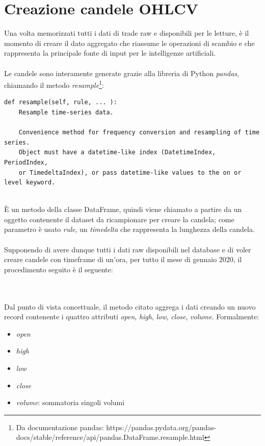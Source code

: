 \documentclass[a4paper,12pt]{report}
\begin{document}
\section{Creazione candele OHLCV}
Una volta memorizzati tutti i dati di trade raw e disponibili per le letture, è il momento di creare il dato aggregato che riassume le operazioni di scambio e che rappresenta la principale fonte di input per le intelligenze artificiali.\\~\\
Le candele sono interamente generate grazie alla libreria di Python \textit{pandas}, chiamando il metodo \textit{resample}\footnote{Da documentazione pandas: https://pandas.pydata.org/pandas-docs/stable/reference/api/pandas.DataFrame.resample.html}:
\begin{verbatim}
def resample(self, rule, ... ):
	Resample time-series data.
	
	Convenience method for frequency conversion and resampling of time series.
	Object must have a datetime-like index (DatetimeIndex, PeriodIndex, 
	or TimedeltaIndex), or pass datetime-like values to the on or level keyword.
	
\end{verbatim}

È un metodo della classe DataFrame, quindi viene chiamato a partire da un oggetto contenente il dataset da ricampionare per creare la candela; come parametro è usato \textit{rule}, un \textit{timedelta} che rappresenta la lunghezza della candela.
\\~\\
Supponendo di avere dunque tutti i dati raw disponibili nel database e di voler creare candele con timeframe di un'ora, per tutto il mese di gennaio 2020, il procedimento seguito è il seguente:


\\~\\
Dal punto di vista concettuale, il metodo citato aggrega i dati creando un nuovo record contenente i quattro attributi \textit{open}, \textit{high}, \textit{low}, \textit{close}, \textit{volume}. Formalmente:
\begin{itemize}
	\item \textit{open}
	\item \textit{high}
	\item \textit{low}
	\item \textit{close}
	\item \textit{volume}: sommatoria singoli volumi %
\end{itemize}
\end{document}
